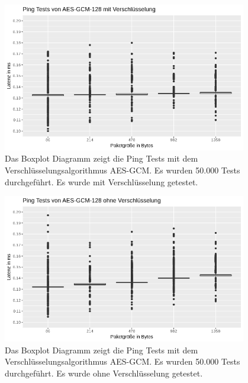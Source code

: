 \begin{figure}[!p]
\centering
\includegraphics[width=0.95\textwidth]{images/aesEping.png}
\caption[Ping Diagramm mit AES-GCM mit Verschlüsselung]{Das Boxplot Diagramm zeigt die Ping Tests mit dem Verschlüsselungsalgorithmus AES-GCM. Es wurden 50.000 Tests durchgeführt. Es wurde mit Verschlüsselung getestet.  }
\label{img:CPU-WE3}
\end{figure}
\begin{figure}[!p]
\centering
\includegraphics[width=0.95\textwidth]{images/aesWEping.png}
\caption[Ping Diagramm mit AES-GCM ohne Verschlüsselung]{Das Boxplot Diagramm zeigt die Ping Tests mit dem Verschlüsselungsalgorithmus AES-GCM. Es wurden 50.000 Tests durchgeführt. Es wurde ohne Verschlüsselung getestet.  }
\label{img:CPU-WE3}
\end{figure}

